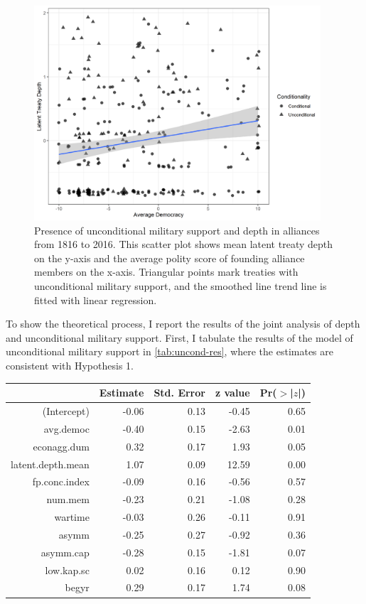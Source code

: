 \documentclass[12pt]{article}
\begin{document}
\begin{figure}[hbtp]
\centering
\includegraphics[width=0.95\textwidth]{../figures/democ-combo.png}
\caption{Presence of unconditional military support and depth in alliances from 1816 to 2016. This scatter plot shows mean latent treaty depth on the y-axis and the average polity score of founding alliance members on the x-axis. Triangular points mark treaties with unconditional military support, and the smoothed line trend line is fitted with linear regression. }
\label{fig:democ-combo}
\end{figure}


To show the theoretical process, I report the results of the joint analysis of depth and unconditional military support. 
First, I tabulate the results of the model of unconditional military support in \autoref{tab:uncond-res}, where the estimates are consistent with Hypothesis 1. 

\begin{table}[ht]
\centering
\begin{tabular}{rrrrr}
  \hline
 & Estimate & Std. Error & z value & Pr($>$|$z$|) \\ 
  \hline
(Intercept) & -0.06 & 0.13 & -0.45 & 0.65 \\ 
  avg.democ & -0.40 & 0.15 & -2.63 & 0.01 \\ 
  econagg.dum & 0.32 & 0.17 & 1.93 & 0.05 \\ 
  latent.depth.mean & 1.07 & 0.09 & 12.59 & 0.00 \\ 
  fp.conc.index & -0.09 & 0.16 & -0.56 & 0.57 \\ 
  num.mem & -0.23 & 0.21 & -1.08 & 0.28 \\ 
  wartime & -0.03 & 0.26 & -0.11 & 0.91 \\ 
  asymm & -0.25 & 0.27 & -0.92 & 0.36 \\ 
  asymm.cap & -0.28 & 0.15 & -1.81 & 0.07 \\ 
  low.kap.sc & 0.02 & 0.16 & 0.12 & 0.90 \\ 
  begyr & 0.29 & 0.17 & 1.74 & 0.08 \\ 
   \hline
\end{tabular}
\label{tab:uncond-res}
\end{table}
\end{document}
